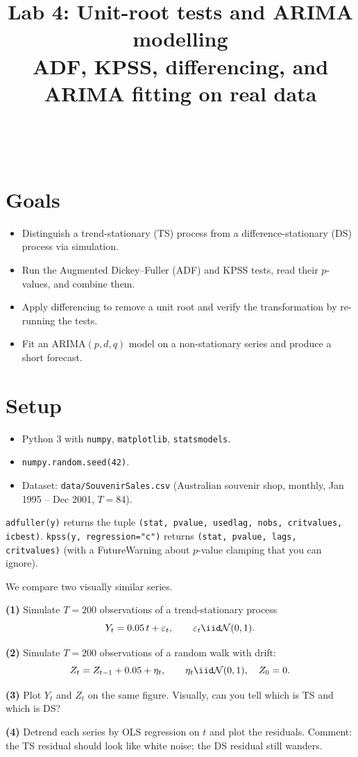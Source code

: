 \documentclass[a4paper,11pt]{article}
\title{Lab 4: Unit-root tests and ARIMA modelling\\
\large ADF, KPSS, differencing, and ARIMA fitting on real data}
\author{\auteurNom\\\auteurEmail\\\auteurInstitution}
\date{\anneeUniversitaire}
\begin{document}
\maketitle

\section*{Goals}
\begin{itemize}
  \item Distinguish a trend-stationary (TS) process from a
        difference-stationary (DS) process via simulation.
  \item Run the Augmented Dickey--Fuller (ADF) and KPSS tests, read
        their $p$-values, and combine them.
  \item Apply differencing to remove a unit root and verify the
        transformation by re-running the tests.
  \item Fit an ARIMA$(p,d,q)$ model on a non-stationary series and
        produce a short forecast.
\end{itemize}

\section*{Setup}
\begin{itemize}
  \item Python 3 with \texttt{numpy}, \texttt{matplotlib},
        \texttt{statsmodels}.
  \item \texttt{numpy.random.seed(42)}.
  \item Dataset: \texttt{data/SouvenirSales.csv} (Australian souvenir
        shop, monthly, Jan 1995 -- Dec 2001, $T = 84$).
\end{itemize}

\begin{warning}
\texttt{adfuller(y)} returns the tuple
\texttt{(stat, pvalue, usedlag, nobs, critvalues, icbest)}.
\texttt{kpss(y, regression="c")} returns
\texttt{(stat, pvalue, lags, critvalues)} (with a Future\-Warning
about $p$-value clamping that you can ignore).
\end{warning}

\begin{exercise}[TS vs.\ DS by simulation]
We compare two visually similar series.

\textbf{(1)} Simulate $T = 200$ observations of a trend-stationary
process
\[
  Y_t = 0.05\, t + \varepsilon_t, \qquad
  \varepsilon_t \iid \mathcal N(0, 1).
\]

\textbf{(2)} Simulate $T = 200$ observations of a random walk with drift:
\[
  Z_t = Z_{t-1} + 0.05 + \eta_t, \qquad
  \eta_t \iid \mathcal N(0, 1), \quad Z_0 = 0.
\]

\textbf{(3)} Plot $Y_t$ and $Z_t$ on the same figure. Visually, can
you tell which is TS and which is DS?

\textbf{(4)} Detrend each series by OLS regression on $t$ and plot
the residuals. Comment: the TS residual should look like white
noise; the DS residual still wanders.
\end{exercise}
\end{document}

